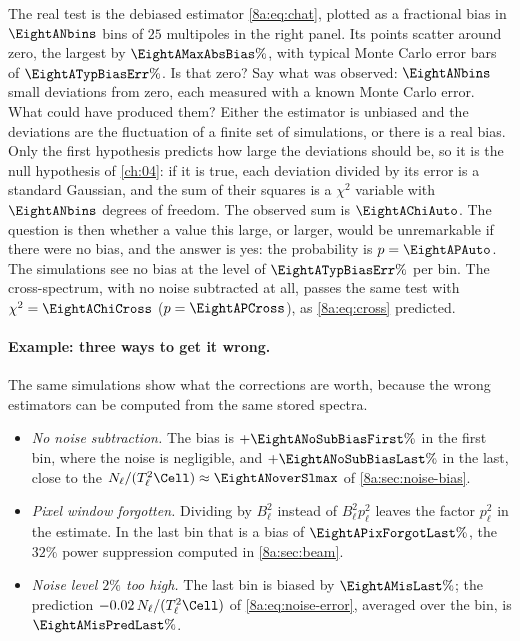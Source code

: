 The real test is the debiased estimator \eqref{8a:eq:chat}, plotted as a fractional bias in
$\EightANbins$ bins of $25$ multipoles in the right panel. Its points scatter around zero, the
largest by $\EightAMaxAbsBias\%$, with typical Monte Carlo error bars of $\EightATypBiasErr\%$.
Is that zero? Say what was observed: $\EightANbins$ small deviations from zero, each measured
with a known Monte Carlo error. What could have produced them? Either the estimator is
unbiased and the deviations are the fluctuation of a finite set of simulations, or there is a
real bias. Only the first hypothesis predicts how large the deviations should be, so it is
the null hypothesis of \cref{ch:04}: if it is true, each deviation divided by its error is a
standard Gaussian, and the sum of their squares is a $\chi^2$ variable with $\EightANbins$
degrees of freedom. The observed sum is $\EightAChiAuto$. The question is then whether a value
this large, or larger, would be unremarkable if there were no bias, and the answer is yes:
the probability is $p=\EightAPAuto$. The simulations see no bias at the level of
$\EightATypBiasErr\%$ per bin. The cross-spectrum, with no noise subtracted at all, passes the
same test with $\chi^2=\EightAChiCross$ ($p=\EightAPCross$), as \eqref{8a:eq:cross} predicted.

\paragraph{Example: three ways to get it wrong.}
The same simulations show what the corrections are worth, because the wrong estimators can
be computed from the same stored spectra.
\begin{itemize}
  \item \emph{No noise subtraction.} The bias is $+\EightANoSubBiasFirst\%$ in the first bin,
        where the noise is negligible, and $+\EightANoSubBiasLast\%$ in the last, close to the
        $N_\ell/(T_\ell^2\Cell)\approx\EightANoverSlmax$ of \cref{8a:sec:noise-bias}.
  \item \emph{Pixel window forgotten.} Dividing by $B_\ell^2$ instead of $B_\ell^2p_\ell^2$ leaves
        the factor $p_\ell^2$ in the estimate. In the last bin that is a bias of
        $\EightAPixForgotLast\%$, the $32\%$ power suppression computed in \cref{8a:sec:beam}.
  \item \emph{Noise level $2\%$ too high.} The last bin is biased by $\EightAMisLast\%$; the
        prediction $-0.02\,N_\ell/(T_\ell^2\Cell)$ of \eqref{8a:eq:noise-error}, averaged over the
        bin, is $\EightAMisPredLast\%$.
\end{itemize}

